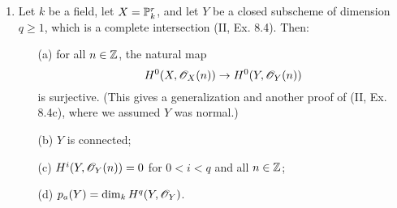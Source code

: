 \documentclass{article}
\begin{document}
\begin{enumerate} [label=\textbf{\arabic*.}, leftmargin=0em]
\item Let $k$ be a field, let $X = \mathbb{P}_k^r$, and let $Y$ be a closed subscheme of dimension $q \geq 1$, which is a complete intersection (II, Ex. 8.4). Then:
\begin{itemize}
  \item[(a)] for all $n \in \mathbb{Z}$, the natural map
  \begin{equation*}
    H^0(X, \mathscr{O}_X(n)) \to H^0(Y, \mathscr{O}_Y(n))
  \end{equation*}
  is surjective. (This gives a generalization and another proof of (II, Ex. 8.4c), where we assumed $Y$ was normal.)
  \item[(b)] $Y$ is connected;
  \item[(c)] $H^i(Y, \mathscr{O}_Y(n)) = 0$ for $0 < i < q$ and all $n \in \mathbb{Z}$;
  \item[(d)] $p_a(Y) = \dim_k{H^q(Y, \mathscr{O}_Y)}$.
\end{itemize}


\end{enumerate}
\end{document}
